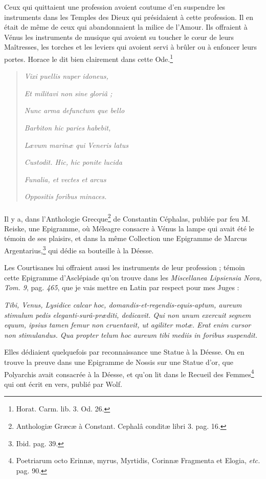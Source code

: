 \documentclass[a4paper, 18pt, oneside]{article}
\begin{document}
Ceux qui quittaient une profession avoient coutume d'en suspendre les instruments dans les Temples des Dieux qui présidaient à cette profession. Il en était de même de ceux qui abandonnaient la milice de l'Amour. Ils offraient à Vénus les instruments de musique qui avoient su toucher le cœur de leurs Maîtresses, les torches et les leviers qui avoient servi à brûler ou à enfoncer leurs portes. Horace le dit bien clairement dans cette Ode.\footnote{Horat. Carm. lib. 3. Od. 26.}
\begin{quotation}
\emph{Vixi puellis nuper idoneus,}

\emph{Et militavi non sine gloriâ ;}

\emph{Nunc arma defunctum que bello}

\emph{Barbiton hic paries habebit,}

\emph{Lævum marinæ qui Veneris latus}

\emph{Custodit. Hic, hic ponite lucida}

\emph{Funalia, et vectes et arcus}

\emph{Oppositis foribus minaces.}
\end{quotation}
\paragraph{}
Il y a, dans l'Anthologie Grecque\footnote{Anthologiæ Græcæ à Constant. Cephalâ conditæ libri 3. pag. 16.} de Constantin Céphalas, publiée par feu M. Reiske, une Epigramme, où Méleagre consacre à Vénus la lampe qui avait été le témoin de ses plaisirs, et dans la même Collection une Epigramme de Marcus Argentarius,\footnote{Ibid. pag. 39.} qui dédie sa bouteille à la Déesse.

Les Courtisanes lui offraient aussi les instruments de leur profession ; témoin cette Epigramme d'Asclépiade qu'on trouve dans les \emph{Miscellanea Lipsiensia Nova, Tom. 9}, pag. \emph{465}, que je vais mettre en Latin par respect pour mes Juges :

\emph{Tibi, Venus, Lysidice calcar hoc, domandis-et-regendis-equis-aptum, aureum stimulum pedis eleganti-surâ-præditi, dedicavit. Qui non unum exercuit segnem equum, ipsius tamen femur non cruentavit, ut agiliter motæ. Erat enim cursor non stimulandus. Qua propter telum hoc aureum tibi mediis in foribus suspendit.}

Elles dédiaient quelquefois par reconnaissance une Statue à la Déesse. On en trouve la preuve dans une Epigramme de Nossis sur une Statue d'or, que Polyarchis avait consacrée à la Déesse, et qu'on lit dans le Recueil des Femmes\footnote{Poetriarum octo Erinnæ, myrus, Myrtidis, Corinnæ Fragmenta et Elogia, \emph{etc.} pag. 90.} qui ont écrit en vers, publié par Wolf.
\end{document}
